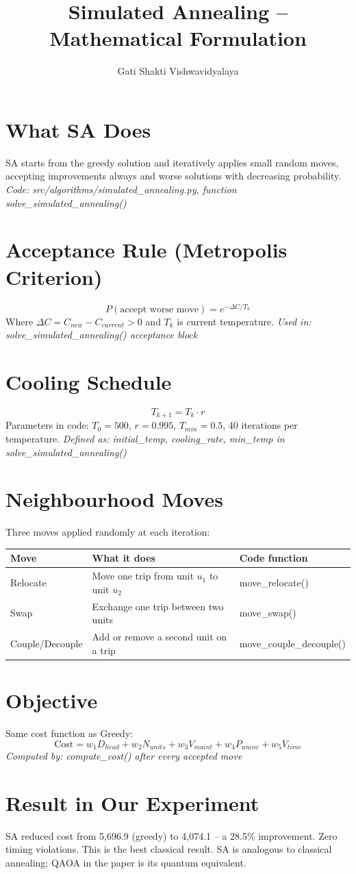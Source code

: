 \documentclass{article}
\title{Simulated Annealing -- Mathematical Formulation}
\author{Gati Shakti Vishwavidyalaya}
\date{}
\begin{document}
\maketitle

\section{What SA Does}
SA starts from the greedy solution and iteratively applies small random
moves, accepting improvements always and worse solutions with decreasing probability.
\textit{Code: src/algorithms/simulated\_annealing.py, function solve\_simulated\_annealing()}

\section{Acceptance Rule (Metropolis Criterion)}
\[
  P(\text{accept worse move}) = e^{-\Delta C / T_k}
\]
Where $\Delta C = C_{new} - C_{current} > 0$ and $T_k$ is current temperature.
\textit{Used in: solve\_simulated\_annealing() acceptance block}

\section{Cooling Schedule}
\[
  T_{k+1} = T_k \cdot r
\]
Parameters in code: $T_0 = 500$, $r = 0.995$, $T_{min} = 0.5$, 40 iterations per temperature.
\textit{Defined as: initial\_temp, cooling\_rate, min\_temp in solve\_simulated\_annealing()}

\section{Neighbourhood Moves}
Three moves applied randomly at each iteration:

\begin{tabular}{lll}
\toprule
Move & What it does & Code function \\
\midrule
Relocate & Move one trip from unit $u_1$ to unit $u_2$ & move\_relocate() \\
Swap & Exchange one trip between two units & move\_swap() \\
Couple/Decouple & Add or remove a second unit on a trip & move\_couple\_decouple() \\
\bottomrule
\end{tabular}

\section{Objective}
Same cost function as Greedy:
\[
  \text{Cost} = w_1 D_{head} + w_2 N_{units} + w_3 V_{maint} + w_4 P_{uncov} + w_5 V_{time}
\]
\textit{Computed by: compute\_cost() after every accepted move}

\section{Result in Our Experiment}
SA reduced cost from 5,696.9 (greedy) to 4,074.1 -- a 28.5\% improvement.
Zero timing violations. This is the best classical result.
SA is analogous to classical annealing; QAOA in the paper is its quantum equivalent.
\end{document}
